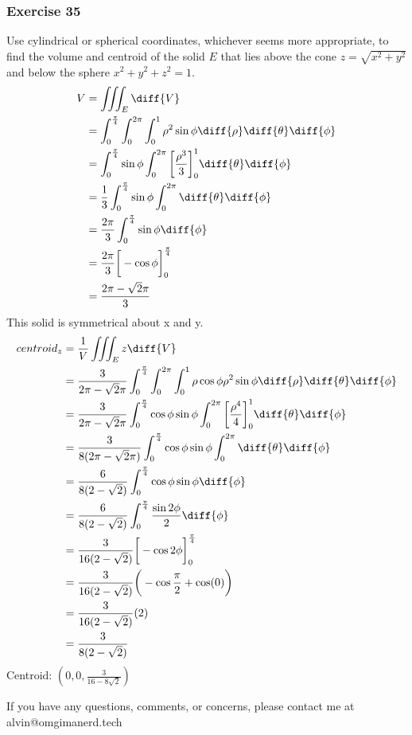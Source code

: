 \documentclass{math}
\begin{document}
\subsubsection*{Exercise 35​}
Use cylindrical or spherical coordinates, whichever seems more appropriate, to
find the volume and centroid of the solid \( E \) that lies above the cone
\( z = \sqrt{x^2+y^2} \) and below the sphere \( x^2+y^2+z^2 = 1 \).
\begin{align*}
  V &= \iiint_{E}\diff{V} \\
  &= \int_{0}^{\frac{\pi}{4}}\int_{0}^{2\pi}\int_{0}^{1}\rho^2\sin\phi
    \diff{\rho}\diff{\theta}\diff{\phi} \\
  &= \int_{0}^{\frac{\pi}{4}}\sin\phi\int_{0}^{2\pi}
    \bigg[\frac{\rho^3}{3}\bigg]_{0}^{1}\diff{\theta}\diff{\phi} \\
  &= \frac{1}{3}\int_{0}^{\frac{\pi}{4}}\sin\phi\int_{0}^{2\pi}
    \diff{\theta}\diff{\phi} \\
  &= \frac{2\pi}{3}\int_{0}^{\frac{\pi}{4}}\sin\phi\diff{\phi} \\
  &= \frac{2\pi}{3}\bigg[-\cos\phi\bigg]_{0}^{\frac{\pi}{4}} \\
  &= \frac{2\pi-\sqrt{2}\pi}{3}
\end{align*}
This solid is symmetrical about x and y.
\begin{align*}
  centroid_z &= \frac{1}{V}\iiint_{E}z\diff{V} \\
  &= \frac{3}{2\pi-\sqrt{2}\pi}\int_{0}^{\frac{\pi}{4}}\int_{0}^{2\pi}
    \int_{0}^{1}\rho\cos\phi\rho^2\sin\phi\diff{\rho}\diff{\theta}\diff{\phi} \\
  &= \frac{3}{2\pi-\sqrt{2}\pi}\int_{0}^{\frac{\pi}{4}}\cos\phi\sin\phi
    \int_{0}^{2\pi}\bigg[\frac{\rho^4}{4}\bigg]_{0}^{1}
    \diff{\theta}\diff{\phi} \\
  &= \frac{3}{8(2\pi-\sqrt{2}\pi)}\int_{0}^{\frac{\pi}{4}}\cos\phi\sin\phi
    \int_{0}^{2\pi}\diff{\theta}\diff{\phi} \\
  &= \frac{6}{8(2-\sqrt{2})}\int_{0}^{\frac{\pi}{4}}\cos\phi\sin\phi
    \diff{\phi} \\
  &= \frac{6}{8(2-\sqrt{2})}\int_{0}^{\frac{\pi}{4}}\frac{\sin2\phi}{2}
    \diff{\phi} \\
  &= \frac{3}{16(2-\sqrt{2})}
    \bigg[-\cos2\phi\bigg]_{0}^{\frac{\pi}{4}} \\
  &= \frac{3}{16(2-\sqrt{2})}\bigg(-\cos\frac{\pi}{2}+\cos(0)\bigg) \\
  &= \frac{3}{16(2-\sqrt{2})}(2) \\
  &= \frac{3}{8(2-\sqrt{2})} \\
\end{align*}
Centroid: \( (0,0,\frac{3}{16-8\sqrt{2}}) \)

\begin{center}
  If you have any questions, comments, or concerns, please contact me at
  alvin@omgimanerd.tech
\end{center}
\end{document}
